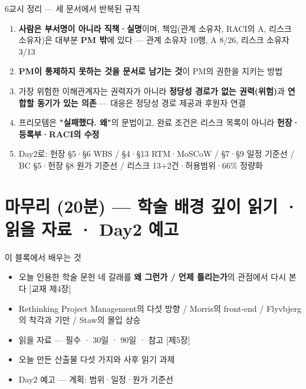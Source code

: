 \begin{frame}{6교시 정리 — 세 문서에서 반복된 규칙}
\begin{enumerate}
\item \textbf{사람은 부서명이 아니라 직책·실명}이며, 책임(관계 소유자, RACI의 A, 리스크 소유자)은 대부분 \textbf{PM 밖}에 있다 — 관계 소유자 10행, A 8/26, 리스크 소유자 3/13
\item \textbf{PM이 통제하지 못하는 것을 문서로 남기는 것}이 PM의 권한을 지키는 방법
\item 가장 위험한 이해관계자는 권력자가 아니라 \textbf{정당성 경로가 없는 권력(위험)}과 \textbf{연합할 동기가 있는 의존} — 대응은 정당성 경로 제공과 후원자 연결
\item 프리모템은 \textbf{"실패했다. 왜"}의 문법이고, 완료 조건은 리스크 목록이 아니라 \textbf{헌장·등록부·RACI의 수정}
\item Day2로: 헌장 §5·§6 \ra{} WBS / §4·§13 \ra{} RTM·MoSCoW / §7·§9 \ra{} 일정 기준선 / BC §5·헌장 §8 \ra{} 원가 기준선 / 리스크 13+2건·허용범위·66\% \ra{} 정량화
\end{enumerate}
\end{frame}

\section{마무리 (20분) — 학술 배경 깊이 읽기 · 읽을 자료 · Day2 예고}

\begin{frame}{이 블록에서 배우는 것}
\begin{itemize}
\item 오늘 인용한 학술 문헌 네 갈래를 \textbf{왜 그런가 / 언제 틀리는가}의 관점에서 다시 본다 [교재 제4장]
\item Rethinking Project Management의 다섯 방향 / Morris의 front-end / Flyvbjerg의 착각과 기만 / Staw의 몰입 상승
\item 읽을 자료 — 필수 · 30일 · 90일 · 참고 [제5장]
\item 오늘 만든 산출물 다섯 가지와 사후 읽기 과제
\item Day2 예고 — 계획: 범위·일정·원가 기준선
\end{itemize}
\end{frame}

